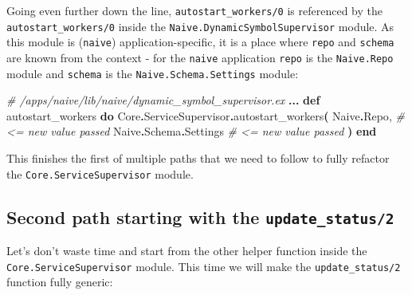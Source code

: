 \documentclass[
  oneside]{book}
\newenvironment{Shaded}{\begin{snugshade}}{\end{snugshade}}
\newcommand{\CommentTok}[1]{\textcolor[rgb]{0.56,0.35,0.01}{\textit{#1}}}
\newcommand{\ConstantTok}[1]{\textcolor[rgb]{0.56,0.35,0.01}{#1}}
\newcommand{\FunctionTok}[1]{\textcolor[rgb]{0.13,0.29,0.53}{\textbf{#1}}}
\newcommand{\KeywordTok}[1]{\textcolor[rgb]{0.13,0.29,0.53}{\textbf{#1}}}
\newcommand{\NormalTok}[1]{#1}
\newcommand{\OperatorTok}[1]{\textcolor[rgb]{0.81,0.36,0.00}{\textbf{#1}}}
\begin{document}
Going even further down the line, \texttt{autostart\_workers/0} is referenced by the \texttt{autostart\_workers/0} inside the \texttt{Naive.DynamicSymbolSupervisor} module. As this module is (\texttt{naive}) application-specific, it is a place where \texttt{repo} and \texttt{schema} are known from the context - for the \texttt{naive} application \texttt{repo} is the \texttt{Naive.Repo} module and \texttt{schema} is the \texttt{Naive.Schema.Settings} module:

\begin{Shaded}
\begin{Highlighting}[]
  \CommentTok{\# /apps/naive/lib/naive/dynamic\_symbol\_supervisor.ex}
  \OperatorTok{...}
  \KeywordTok{def}\NormalTok{ autostart\_workers }\KeywordTok{do}
    \ConstantTok{Core}\OperatorTok{.}\ConstantTok{ServiceSupervisor}\OperatorTok{.}\NormalTok{autostart\_workers}\FunctionTok{(}
      \ConstantTok{Naive}\OperatorTok{.}\ConstantTok{Repo}\NormalTok{,           }\CommentTok{\# \textless{}= new value passed}
      \ConstantTok{Naive}\OperatorTok{.}\ConstantTok{Schema}\OperatorTok{.}\ConstantTok{Settings} \CommentTok{\# \textless{}= new value passed}
    \FunctionTok{)}
  \KeywordTok{end}
\end{Highlighting}
\end{Shaded}

This finishes the first of multiple paths that we need to follow to fully refactor the \texttt{Core.ServiceSupervisor} module.

\newpage

\subsection{\texorpdfstring{Second path starting with the \texttt{update\_status/2}}{Second path starting with the update\_status/2}}\label{second-path-starting-with-the-update_status2}

Let's don't waste time and start from the other helper function inside the \texttt{Core.ServiceSupervisor} module. This time we will make the \texttt{update\_status/2} function fully generic:
\end{document}
